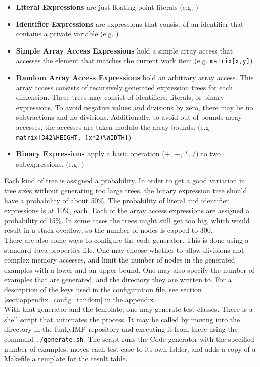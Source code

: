 \begin{itemize}
	\item \textbf{Literal Expressions} are just floating point literals (e.g. )
	\item \textbf{Identifier Expressions} are expressions that consist of an identifier that contains a private variable (e.g. )
	\item \textbf{Simple Array Access Expressions} hold a simple array access that accesses the element that matches the current work item (e.g. \verb!matrix[x,y]!)
	\item \textbf{Random Array Access Expressions} hold an arbitrary array access. This array access consists of recursively generated expression trees for each dimension. These trees may consist of identifiers, literals, or binary expressions. To avoid negative values and divisions by zero, there may be no subtractions and no divisions. Additionally, to avoid out of bounds array accesses, the accesses are taken modulo the array bounds. (e.g \verb!matrix[342%HEIGHT, (x*2)%WIDTH]!) 
	\item \textbf{Binary Expressions} apply a basic operation ($+$, $-$, $*$, $/$) to two subexpressions. (e.g. )
\end{itemize}

Each kind of tree is assigned a probability. In order to get a good variation in tree sizes without generating too large trees, the binary expression tree should have a probability of about 50\%. The probability of literal and identifier expressions is at 10\%, each. Each of the array access expressions are assigned a probability of 15\%. In some cases the trees might still get too big, which would result in a stack overflow, so the number of nodes is capped to 300. \\

There are also some ways to configure the code generator. This is done using a standard Java properties file. One may choose whether to allow divisions and complex memory accesses, and limit the number of nodes in the generated examples with a lower and an upper bound. One may also specify the number of examples that are generated, and the directory they are written to. For a description of the keys used in the configuration file, see section \ref{sect:appendix_config_random} in the appendix. \\

With that generator and the template, one may generate test classes. There is a shell script that automates the process. It may be called by moving into the  directory in the funkyIMP repository and executing it from there using the command \verb!./generate.sh!. The script runs the Code generator with the specified number of examples, moves each test case to its own folder, and adds a copy of a Makefile a template for the result table.\\
\newpage



